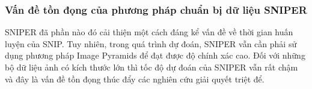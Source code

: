 {    \subsubsection*{Vấn đề tồn đọng của phương pháp chuẩn bị dữ liệu SNIPER }
    SNIPER  đã phần nào đó cải thiện một cách đáng kể vấn đề về thời gian huấn luyện của SNIP.
    Tuy nhiên, trong quá trình dự đoán, SNIPER  vẫn cần phải sử dụng phương pháp Image Pyramids để đạt được độ chính xác cao.
    Đối với những bộ dữ liệu ảnh có kích thước lớn thì tốc độ dự đoán của SNIPER  vẫn rất chậm và đây là vấn đề tồn đọng thúc đẩy các nghiên cứu giải quyết triệt để.
}